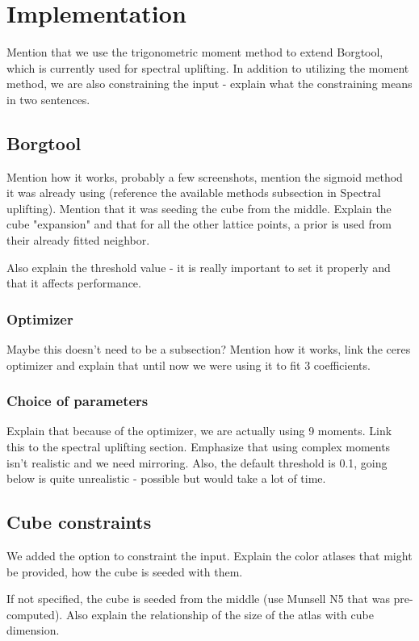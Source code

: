 \chapter{Implementation}

Mention that we use the trigonometric moment method to extend Borgtool, which is currently used for spectral uplifting. In addition to utilizing the moment method, we are also constraining the input - explain what the constraining means in two sentences.

\section{Borgtool}

Mention how it works, probably a few screenshots, mention the sigmoid method it was already using (reference the available methods subsection in Spectral uplifting). Mention that it was seeding the cube from the middle. Explain the cube "expansion" and that for all the other lattice points, a prior is used from their already fitted neighbor.

Also explain the threshold value - it is really important to set it properly and that it affects performance.

\subsection{Optimizer}
Maybe this doesn't need to be a subsection? Mention how it works, link the ceres optimizer and explain that until now we were using it to fit 3 coefficients.

\subsection{Choice of parameters}
Explain that because of the optimizer, we are actually using 9 moments. Link this to the spectral uplifting section. Emphasize that using complex moments isn't realistic and we need mirroring. Also, the default threshold is 0.1, going below is quite unrealistic - possible but would take a lot of time.

\section{Cube constraints}

We added the option to constraint the input. Explain the color atlases that might be provided, how the cube is seeded with them.

If not specified, the cube is seeded from the middle (use Munsell N5 that was pre-computed). Also explain the relationship of the size of the atlas with cube dimension.

